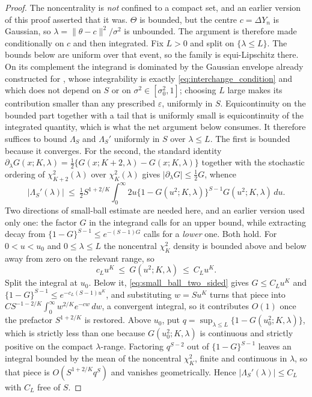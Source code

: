 \documentclass[11pt]{article}
\theoremstyle{definition}
\begin{document}
\begin{proof}
The noncentrality is \emph{not} confined to a compact set, and an earlier version of this proof asserted that it was. $\Theta$ is bounded, but the centre $c=\Delta Y_n$ is Gaussian, so $\lambda=\lVert\theta-c\rVert^2/\sigma^2$ is unbounded. The argument is therefore made conditionally on $c$ and then integrated. Fix $L>0$ and split on $\{\lambda\le L\}$. The bounds below are uniform over that event, so the family is equi-Lipschitz there. On its complement the integrand is dominated by the Gaussian envelope already constructed for , whose integrability is exactly \eqref{eq:interchange_condition} and which does not depend on $S$ or on $\sigma^2\in[\sigma_0^2,1]$; choosing $L$ large makes its contribution smaller than any prescribed $\varepsilon$, uniformly in $S$. Equicontinuity on the bounded part together with a tail that is uniformly small is equicontinuity of the integrated quantity, which is what the net argument below consumes. It therefore suffices to bound $\Lambda_S$ and $\Lambda_S'$ uniformly in $S$ over $\lambda\le L$. The first is bounded because it converges. For the second, the standard identity $\partial_\lambda G(x;K,\lambda)=\tfrac12\{G(x;K+2,\lambda)-G(x;K,\lambda)\}$ together with the stochastic ordering of $\chi^2_{K+2}(\lambda)$ over $\chi^2_K(\lambda)$ gives $\lvert\partial_\lambda G\rvert\le\tfrac12G$, whence
\[
\lvert\Lambda_S'(\lambda)\rvert
\ \le\ \tfrac12S^{1+2/K}\!\int_0^\infty\!2u\bigl\{1-G(u^2;K,\lambda)\bigr\}^{S-1}G(u^2;K,\lambda)\,du .
\]
Two directions of small-ball estimate are needed here, and an earlier version used only one: the factor $G$ in the integrand calls for an upper bound, while extracting decay from $\{1-G\}^{S-1}\le e^{-(S-1)G}$ calls for a \emph{lower} one. Both hold. For $0<u<u_0$ and $0\le\lambda\le L$ the noncentral $\chi^2_K$ density is bounded above and below away from zero on the relevant range, so
\begin{equation}\label{eq:small_ball_two_sided}
c_Lu^K\ \le\ G(u^2;K,\lambda)\ \le\ C_Lu^K .
\end{equation}
Split the integral at $u_0$. Below it, \eqref{eq:small_ball_two_sided} gives $G\le C_Lu^K$ and $\{1-G\}^{S-1}\le e^{-c_L(S-1)u^K}$, and substituting $w=Su^K$ turns that piece into $CS^{-1-2/K}\int_0^\infty w^{2/K}e^{-cw}\,dw$, a convergent integral, so it contributes $O(1)$ once the prefactor $S^{1+2/K}$ is restored. Above $u_0$, put $q=\sup_{\lambda\le L}\{1-G(u_0^2;K,\lambda)\}$, which is strictly less than one because $G(u_0^2;K,\lambda)$ is continuous and strictly positive on the compact $\lambda$-range. Factoring $q^{S-2}$ out of $\{1-G\}^{S-1}$ leaves an integral bounded by the mean of the noncentral $\chi^2_K$, finite and continuous in $\lambda$, so that piece is $O(S^{1+2/K}q^{S})$ and vanishes geometrically. Hence $\lvert\Lambda_S'(\lambda)\rvert\le C_L$ with $C_L$ free of $S$.


\end{proof}
\end{document}

